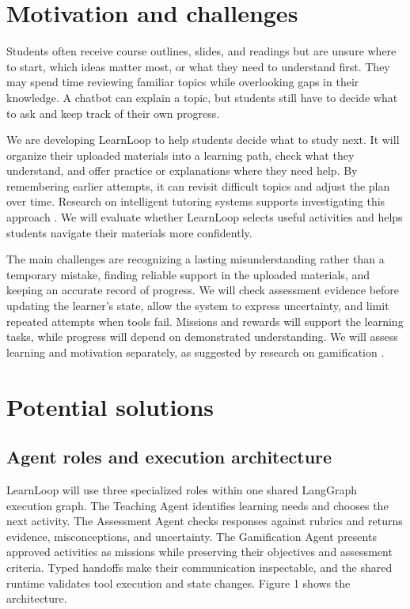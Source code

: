 \documentclass{article}
\begin{document}
\section{Motivation and challenges}

Students often receive course outlines, slides, and readings but are unsure where to start, which ideas matter most, or what they need to understand first. They may spend time reviewing familiar topics while overlooking gaps in their knowledge. A chatbot can explain a topic, but students still have to decide what to ask and keep track of their own progress.

We are developing LearnLoop to help students decide what to study next. It will organize their uploaded materials into a learning path, check what they understand, and offer practice or explanations where they need help. By remembering earlier attempts, it can revisit difficult topics and adjust the plan over time. Research on intelligent tutoring systems supports investigating this approach \citep{ref3}. We will evaluate whether LearnLoop selects useful activities and helps students navigate their materials more confidently.

The main challenges are recognizing a lasting misunderstanding rather than a temporary mistake, finding reliable support in the uploaded materials, and keeping an accurate record of progress. We will check assessment evidence before updating the learner's state, allow the system to express uncertainty, and limit repeated attempts when tools fail. Missions and rewards will support the learning tasks, while progress will depend on demonstrated understanding. We will assess learning and motivation separately, as suggested by research on gamification \citep{ref4}.

\section{Potential solutions}

\subsection{Agent roles and execution architecture}

LearnLoop will use three specialized roles within one shared LangGraph execution graph. The Teaching Agent identifies learning needs and chooses the next activity. The Assessment Agent checks responses against rubrics and returns evidence, misconceptions, and uncertainty. The Gamification Agent presents approved activities as missions while preserving their objectives and assessment criteria. Typed handoffs make their communication inspectable, and the shared runtime validates tool execution and state changes. Figure 1 shows the architecture.
\end{document}
